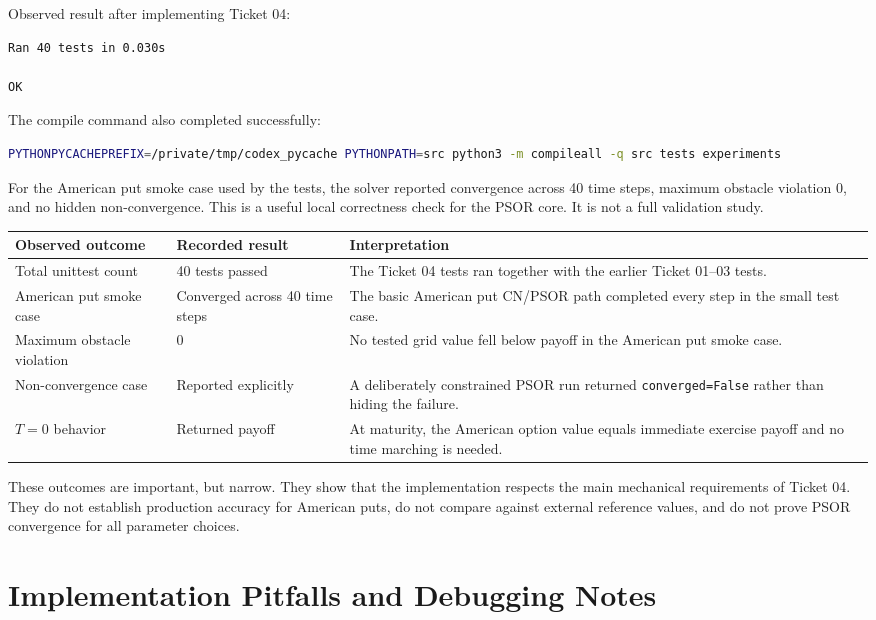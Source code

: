 \documentclass[11pt,a4paper]{article}
\newcommand{\code}[1]{\texttt{#1}}
\begin{document}
Observed result after implementing Ticket 04:
\begin{lstlisting}
Ran 40 tests in 0.030s

OK
\end{lstlisting}

The compile command also completed successfully:
\begin{lstlisting}[language=bash]
PYTHONPYCACHEPREFIX=/private/tmp/codex_pycache PYTHONPATH=src python3 -m compileall -q src tests experiments
\end{lstlisting}

For the American put smoke case used by the tests, the solver reported convergence across 40 time
steps, maximum obstacle violation \(0\), and no hidden non-convergence. This is a useful local
correctness check for the PSOR core. It is not a full validation study.

\begin{longtable}{L{0.30\textwidth}L{0.26\textwidth}L{0.32\textwidth}}
\toprule
Observed outcome & Recorded result & Interpretation \\
\midrule
\endhead
Total unittest count &
40 tests passed &
The Ticket 04 tests ran together with the earlier Ticket 01--03 tests. \\
American put smoke case &
Converged across 40 time steps &
The basic American put CN/PSOR path completed every step in the small test case. \\
Maximum obstacle violation &
\(0\) &
No tested grid value fell below payoff in the American put smoke case. \\
Non-convergence case &
Reported explicitly &
A deliberately constrained PSOR run returned \code{converged=False} rather than hiding the
failure. \\
\(T=0\) behavior &
Returned payoff &
At maturity, the American option value equals immediate exercise payoff and no time marching is
needed. \\
\bottomrule
\end{longtable}

These outcomes are important, but narrow. They show that the implementation respects the main
mechanical requirements of Ticket 04. They do not establish production accuracy for American puts,
do not compare against external reference values, and do not prove PSOR convergence for all
parameter choices.

\section{Implementation Pitfalls and Debugging Notes}
\end{document}
